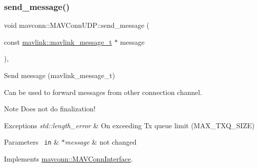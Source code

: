 \mbox{\label{group__mavconn_gae33a3895701a613a72d7fc1ab9bbb3d8}} 
\subsubsection{\texorpdfstring{send\_message()}{send\_message()}\hspace{0.1cm}{\footnotesize\ttfamily [3/10]}}
{\footnotesize\ttfamily void mavconn\+::\+M\+A\+V\+Conn\+U\+D\+P\+::send\+\_\+message (\begin{DoxyParamCaption}\item[{const \mbox{\hyperlink{include__v0_89_2mavlink__types_8h_a63b963764c09dc72f4910c1521e325b9}{mavlink\+::mavlink\+\_\+message\+\_\+t}} $\ast$}]{message }\end{DoxyParamCaption})\hspace{0.3cm}{\ttfamily [override]}, {\ttfamily [virtual]}}



Send message (mavlink\+\_\+message\+\_\+t) 

Can be used to forward messages from other connection channel.

\begin{DoxyNote}{Note}
Does not do finalization!
\end{DoxyNote}

\begin{DoxyExceptions}{Exceptions}
{\em std\+::length\+\_\+error} & On exceeding Tx queue limit (M\+A\+X\+\_\+\+T\+X\+Q\+\_\+\+S\+I\+ZE) \\
\hline
\end{DoxyExceptions}

\begin{DoxyParams}[1]{Parameters}
\mbox{\texttt{ in}}  & {\em $\ast$message} & not changed \\
\hline
\end{DoxyParams}


Implements \mbox{\hyperlink{group__mavconn_gad807cf7e1935548e0c7ba94943cbb7aa}{mavconn\+::\+M\+A\+V\+Conn\+Interface}}.

\mbox{\label{group__mavconn_ga6f835299707df78f3694cef5853139d4}} 
